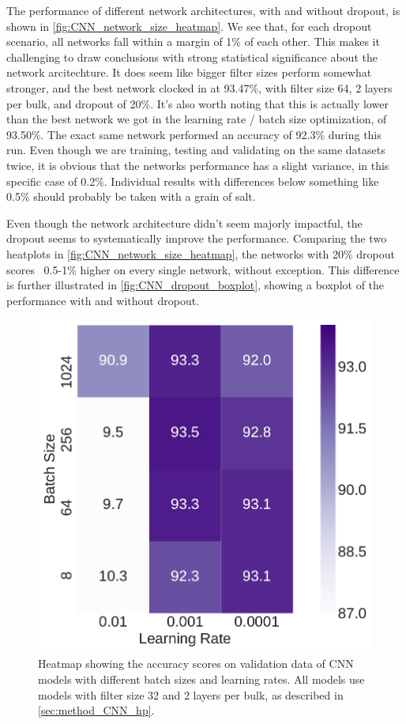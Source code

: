 \documentclass[10pt, twocolumn]{article}
\begin{document}
The performance of different network architectures, with and without dropout, is shown in \cref{fig:CNN_network_size_heatmap}. We see that, for each dropout scenario, all networks fall within a margin of 1\% of each other. This makes it challenging to draw conclusions with strong statistical significance about the network arcitechture. It does seem like bigger filter sizes perform somewhat stronger, and the best network clocked in at 93.47\%, with filter size 64, 2 layers per bulk, and dropout of 20\%. It's also worth noting that this is actually lower than the best network we got in the learning rate / batch size optimization, of 93.50\%. The exact same network performed an accuracy of 92.3\% during this run. Even though we are training, testing and validating on the same datasets twice, it is obvious that the networks performance has a slight variance, in this specific case of 0.2\%. Individual results with differences below something like 0.5\% should probably be taken with a grain of salt.

Even though the network architecture didn't seem majorly impactful, the dropout seems to systematically improve the performance. Comparing the two heatplots in \cref{fig:CNN_network_size_heatmap}, the networks with 20\% dropout scores ~0.5-1\% higher on every single network, without exception. This difference is further illustrated in \cref{fig:CNN_dropout_boxplot}, showing a boxplot of the performance with and without dropout. 

\begin{figure}
    \centering
    \includegraphics[scale=0.4]{../figs/CNN_lr_batchsize_heatmap.pdf}
    \caption{Heatmap showing the accuracy scores on validation data of CNN models with different batch sizes and learning rates. All models use models with filter size 32 and 2 layers per bulk, as described in \cref{sec:method_CNN_hp}.}
    \label{fig:CNN_lr_batch_heatmap}
\end{figure}
\end{document}
